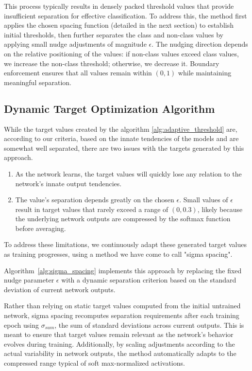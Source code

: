 \documentclass[12pt,fleqn,a4paper]{article}
\begin{document}
This process typically results in densely packed threshold values that provide insufficient separation for effective classification. To address this, the method first applies the chosen spacing function (detailed in the next section) to establish initial thresholds, then further separates the class and non-class values by applying small nudge adjustments of magnitude $\epsilon$. The nudging direction depends on the relative positioning of the values: if non-class values exceed class values, we increase the non-class threshold; otherwise, we decrease it. Boundary enforcement ensures that all values remain within $(0,1)$ while maintaining meaningful separation.

\subsection{Dynamic Target Optimization Algorithm}
While the target values created by the algorithm \ref{alg:adaptive_threshold} are, according to our criteria, based on the innate tendencies of the models and are somewhat well separated, there are two issues with the targets generated by this approach.
\begin{enumerate}
    \item As the network learns, the target values will quickly lose any relation to the network's innate output tendencies.
    \item The value's separation depends greatly on the chosen $\epsilon$. Small values of $\epsilon$ result in target values that rarely exceed a range of $(0, 0.3)$, likely because the underlying network outputs are compressed by the softmax function before averaging.
\end{enumerate}
To address these limitations, we continuously adapt these generated target values as training progresses, using a method we have come to call "sigma spacing". 

Algorithm~\ref{alg:sigma_spacing} implements this approach by replacing the fixed nudge parameter $\epsilon$ with a dynamic separation criterion based on the standard deviation of current network outputs.

Rather than relying on static target values computed from the initial untrained network, sigma spacing recomputes separation requirements after each training epoch using $\sigma_{sum}$, the sum of standard deviations across current outputs. This is meant to ensure that target values remain relevant as the network's behavior evolves during training. Additionally, by scaling adjustments according to the actual variability in network outputs, the method automatically adapts to the compressed range typical of soft max-normalized activations.
\end{document}

